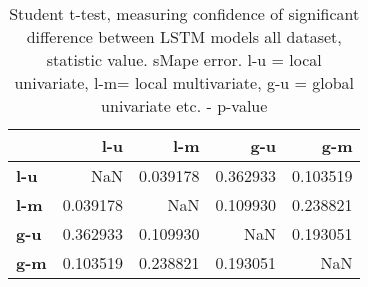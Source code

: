\begin{table}[h]
\centering
\caption{Student t-test, measuring confidence of significant difference between LSTM models all dataset, statistic value. sMape error.  l-u = local univariate, l-m= local multivariate, g-u = global univariate etc. - p-value}
\label{table:ttest-p-values-lstm-experiments-sMAPE-all-dataset}
\begin{tabular}{lrrrr}
\toprule
{} &       l-u &       l-m &       g-u &       g-m \\
\midrule
\textbf{l-u} &       NaN &  0.039178 &  0.362933 &  0.103519 \\
\textbf{l-m} &  0.039178 &       NaN &  0.109930 &  0.238821 \\
\textbf{g-u} &  0.362933 &  0.109930 &       NaN &  0.193051 \\
\textbf{g-m} &  0.103519 &  0.238821 &  0.193051 &       NaN \\
\bottomrule
\end{tabular}
\end{table}
